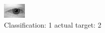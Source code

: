 \begin{figure}[h!]
\begin{center}
\includegraphics[width=0.60\columnwidth]{figures/ID464_class_1_target_2.png}
\end{center}
\caption{ Classification: 1 actual target: 2}
\label{fig:ID464_class_1_target_2}
\end{figure}
